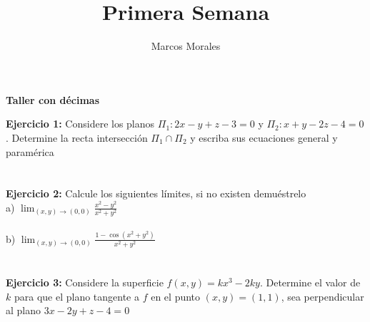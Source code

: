 \documentclass{article}
\author{Marcos Morales}
\affil{Universidad Finis Terrae}
\title{Primera Semana\\}
\theoremstyle{definition}
\begin{document}
\begin{center}
    \Large{\textbf{Taller con décimas}}
\end{center}


\setlength{\parindent}{0cm}


\textbf{Ejercicio 1:} Considere los planos $\displaystyle \Pi_1: 2x-y+z-3=0$ y  $\displaystyle \Pi_2: x+y-2z-4=0$. Determine la recta intersección $\Pi_1 \cap \Pi_2$ y escriba sus ecuaciones general y paramérica \\ \\ \\





\textbf{Ejercicio 2:} Calcule los siguientes límites, si no existen demuéstrelo \\

a) $\displaystyle \lim_{(x,y)\to (0,0)} \frac{x^2 - y^2}{x^2 + y^2}$ \\ \\

b) $\displaystyle \lim_{(x,y)\to (0,0)} \frac{1 - \cos(x^2+y^2)}{x^2 + y^2}$ \\ \\ \\





\textbf{Ejercicio 3:} Considere la superficie $f(x,y)= kx^3-2ky$. Determine el valor de $k$ para que el plano tangente a $f$ en el punto $(x,y)=(1,1)$, sea perpendicular al plano $3x-2y+z-4=0$
\end{document}
